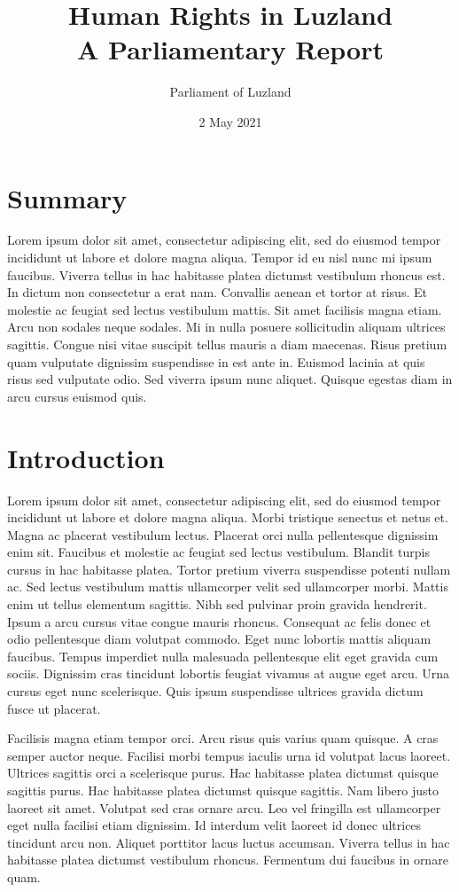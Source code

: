 \documentclass[12pt, oneside, a4paper]{article}
\title{Human Rights in Luzland \\ A Parliamentary Report}
\author{Parliament of Luzland}
\date{2 May 2021}
\begin{document}
\maketitle 

\section*{Summary}
\renewcommand\baselinestretch{1}\selectfont
\noindent Lorem ipsum dolor sit amet, consectetur adipiscing elit, sed do eiusmod tempor incididunt ut labore et dolore magna aliqua. Tempor id eu nisl nunc mi ipsum faucibus. Viverra tellus in hac habitasse platea dictumst vestibulum rhoncus est. In dictum non consectetur a erat nam. Convallis aenean et tortor at risus. Et molestie ac feugiat sed lectus vestibulum mattis. Sit amet facilisis magna etiam. Arcu non sodales neque sodales. Mi in nulla posuere sollicitudin aliquam ultrices sagittis. Congue nisi vitae suscipit tellus mauris a diam maecenas. Risus pretium quam vulputate dignissim suspendisse in est ante in. Euismod lacinia at quis risus sed vulputate odio. Sed viverra ipsum nunc aliquet. Quisque egestas diam in arcu cursus euismod quis. 

\clearpage
\section*{Introduction}
Lorem ipsum dolor sit amet, consectetur adipiscing elit, sed do eiusmod tempor incididunt ut labore et dolore magna aliqua. Morbi tristique senectus et netus et. Magna ac placerat vestibulum lectus. Placerat orci nulla pellentesque dignissim enim sit. Faucibus et molestie ac feugiat sed lectus vestibulum. Blandit turpis cursus in hac habitasse platea. Tortor pretium viverra suspendisse potenti nullam ac. Sed lectus vestibulum mattis ullamcorper velit sed ullamcorper morbi. Mattis enim ut tellus elementum sagittis. Nibh sed pulvinar proin gravida hendrerit. Ipsum a arcu cursus vitae congue mauris rhoncus. Consequat ac felis donec et odio pellentesque diam volutpat commodo. Eget nunc lobortis mattis aliquam faucibus. Tempus imperdiet nulla malesuada pellentesque elit eget gravida cum sociis. Dignissim cras tincidunt lobortis feugiat vivamus at augue eget arcu. Urna cursus eget nunc scelerisque. Quis ipsum suspendisse ultrices gravida dictum fusce ut placerat.

Facilisis magna etiam tempor orci. Arcu risus quis varius quam quisque. A cras semper auctor neque. Facilisi morbi tempus iaculis urna id volutpat lacus laoreet. Ultrices sagittis orci a scelerisque purus. Hac habitasse platea dictumst quisque sagittis purus. Hac habitasse platea dictumst quisque sagittis. Nam libero justo laoreet sit amet. Volutpat sed cras ornare arcu. Leo vel fringilla est ullamcorper eget nulla facilisi etiam dignissim. Id interdum velit laoreet id donec ultrices tincidunt arcu non. Aliquet porttitor lacus luctus accumsan. Viverra tellus in hac habitasse platea dictumst vestibulum rhoncus. Fermentum dui faucibus in ornare quam.
\end{document}
